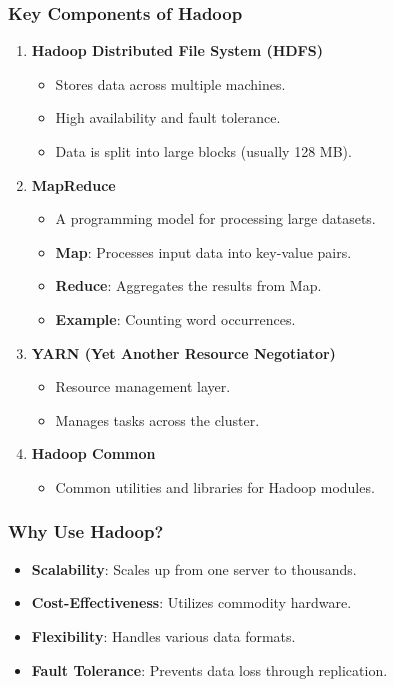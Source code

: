 \documentclass[aspectratio=169]{beamer}
\begin{document}
\begin{frame}[fragile]
    \frametitle{Key Components of Hadoop}

    \begin{enumerate}
        \item \textbf{Hadoop Distributed File System (HDFS)}
            \begin{itemize}
                \item Stores data across multiple machines.
                \item High availability and fault tolerance.
                \item Data is split into large blocks (usually 128 MB).
            \end{itemize}

        \item \textbf{MapReduce}
            \begin{itemize}
                \item A programming model for processing large datasets.
                \item \textbf{Map}: Processes input data into key-value pairs.
                \item \textbf{Reduce}: Aggregates the results from Map.
                \item \textbf{Example}: Counting word occurrences.
            \end{itemize}

        \item \textbf{YARN (Yet Another Resource Negotiator)}
            \begin{itemize}
                \item Resource management layer.
                \item Manages tasks across the cluster.
            \end{itemize}

        \item \textbf{Hadoop Common}
            \begin{itemize}
                \item Common utilities and libraries for Hadoop modules.
            \end{itemize}
    \end{enumerate}
\end{frame}

\begin{frame}[fragile]
    \frametitle{Why Use Hadoop?}

    \begin{itemize}
        \item \textbf{Scalability}: Scales up from one server to thousands.
        \item \textbf{Cost-Effectiveness}: Utilizes commodity hardware.
        \item \textbf{Flexibility}: Handles various data formats.
        \item \textbf{Fault Tolerance}: Prevents data loss through replication.
    \end{itemize}
\end{frame}
\end{document}
